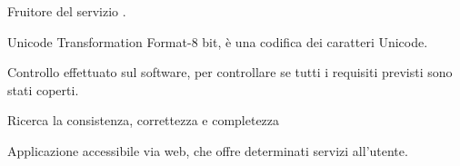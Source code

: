 Fruitore del servizio \ProjectName{}.

Unicode Transformation Format-8 bit, è una codifica dei caratteri Unicode. 


Controllo effettuato sul software, per controllare se tutti i requisiti previsti sono stati coperti.

Ricerca la consistenza, correttezza e completezza


Applicazione accessibile via web, che offre determinati servizi all'utente.

%


